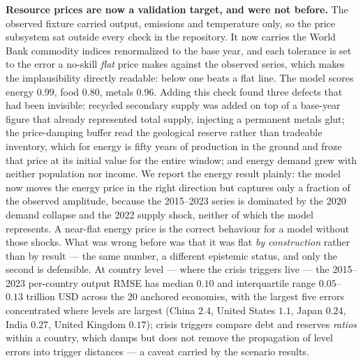 \documentclass[a4paper,fleqn]{cas-sc}
\begin{document}
\textbf{Resource prices are now a validation target, and were not before.} The observed fixture
carried output, emissions and temperature only, so the price subsystem sat outside every check
in the repository. It now carries the World Bank commodity indices renormalized to the base
year, and each tolerance is set to the error a no-skill \emph{flat} price makes against the
observed series, which makes the implausibility directly readable: below one beats a flat line.
The model scores energy $0.99$, food $0.80$, metals $0.96$. Adding this check found three
defects that had been invisible: recycled secondary supply was added on top of a base-year
figure that already represented total supply, injecting a permanent metals glut; the
price-damping buffer read the geological reserve rather than tradeable inventory, which for
energy is fifty years of production in the ground and froze that price at its initial value for
the entire window; and energy demand grew with neither population nor income. We report the
energy result plainly: the model now moves the energy price in the right direction but captures
only a fraction of the observed amplitude, because the 2015--2023 series is dominated by the
2020 demand collapse and the 2022 supply shock, neither of which the model represents. A
near-flat energy price is the correct behaviour for a model without those shocks. What was
wrong before was that it was flat \emph{by construction} rather than by result --- the same
number, a different epistemic status, and only the second is defensible. At country
level --- where the crisis triggers live --- the 2015--2023 per-country output RMSE has median
$0.10$ and interquartile range $0.05$--$0.13$ trillion USD across the 20 anchored economies,
with the largest five errors concentrated where levels are largest (China $2.4$, United States
$1.1$, Japan $0.24$, India $0.27$, United Kingdom $0.17$); crisis triggers compare debt and
reserves \emph{ratios} within a country, which damps but does not remove the propagation of
level errors into trigger distances --- a caveat carried by the scenario results.
\end{document}
